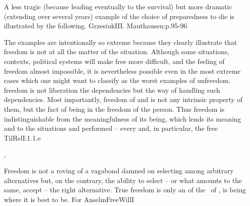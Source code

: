 A less tragic (because leading eventually to the survival) but more dramatic
(extending over several years) example of the choice of preparedness to die is
illustrated by the following.  \citet{We carried soil in wheelbarrows, bringing
  it from some 
fifty meters all the time running at the very edge of the stone pit. The wall
was some tens of meters high and was here quite perpendicular. Running we
carried the soil and kapo was running along with us, beating us with the stick
in the shoulders, hands, heads, faces. [...] After some minutes I realized that
I won't manage a whole hour. He will kill me -- I thought. Good, but you too,
bastard, will get killed and I will have greater pleasure going to heaven in
such a company. Kapo was short. I decided to catch him when he gets behind me
and fall back. If everything goes fine, we both flutter down to the bottom of
the pit, and there it stops, the end.}{Grzesiuk}{III. Mauthausen;p.95-96}

The examples are intentionally so extreme because they clearly illustrate that 
freedom is not at all the matter of the  situation. Although some
situations, contexts, political systems will make free  more difficult,
and the feeling of freedom almost impossible, it is nevertheless
possible even in the most extreme cases which one might want to classify as the worst
examples of unfreedom.   freedom is not liberation  the
 dependencies but the way of handling such dependencies. Most
importantly,  freedom of  and  is not any
intrinsic property of them, but the fact of being  in the
freedom of the person. Thus  freedom is indistinguishable from the
meaningfulness of its being, which lends its meaning and  to the
 situations and performed  -- every  and, in
particular, the free \citet{act of meaning is related to the unconditioned
meaning viewed as an abyss of meaning.}{TilRel}{I:1.1.e}


\sep

\pa
{}Freedom is not a roving of a vagabond damned on selecting among arbitrary
alternatives but, on the contrary, the ability to select -- or what amounts to
the same, accept -- the right alternative.  True freedom is only an 
of the \nexus\ of \yes, is being where it is best to be. For \citet{one who is
  as he ought to be, and as it is expedient for him to be, such that he is
  unable to lose this state, is freer than one who is such that he can lose it
  and be led into what is indecent and inexpedient for him.}{AnselmFreeWill}{I}
 
